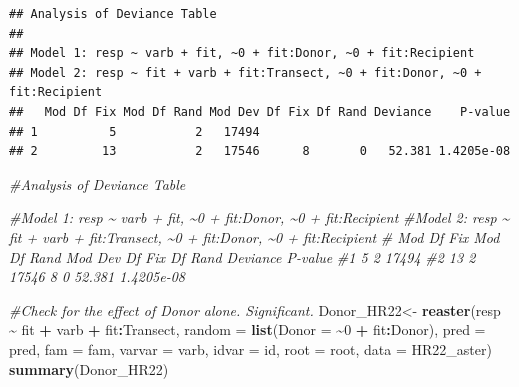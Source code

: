 \documentclass[
]{article}
\newenvironment{Shaded}{\begin{snugshade}}{\end{snugshade}}
\newcommand{\AttributeTok}[1]{\textcolor[rgb]{0.13,0.29,0.53}{#1}}
\newcommand{\CommentTok}[1]{\textcolor[rgb]{0.56,0.35,0.01}{\textit{#1}}}
\newcommand{\DecValTok}[1]{\textcolor[rgb]{0.00,0.00,0.81}{#1}}
\newcommand{\FunctionTok}[1]{\textcolor[rgb]{0.13,0.29,0.53}{\textbf{#1}}}
\newcommand{\NormalTok}[1]{#1}
\newcommand{\OtherTok}[1]{\textcolor[rgb]{0.56,0.35,0.01}{#1}}
\newcommand{\SpecialCharTok}[1]{\textcolor[rgb]{0.81,0.36,0.00}{\textbf{#1}}}
\begin{document}
\begin{verbatim}
## Analysis of Deviance Table
## 
## Model 1: resp ~ varb + fit, ~0 + fit:Donor, ~0 + fit:Recipient
## Model 2: resp ~ fit + varb + fit:Transect, ~0 + fit:Donor, ~0 + fit:Recipient
##   Mod Df Fix Mod Df Rand Mod Dev Df Fix Df Rand Deviance    P-value
## 1          5           2   17494                                   
## 2         13           2   17546      8       0   52.381 1.4205e-08
\end{verbatim}

\begin{Shaded}
\begin{Highlighting}[]
\CommentTok{\#Analysis of Deviance Table}

\CommentTok{\#Model 1: resp \textasciitilde{} varb + fit, \textasciitilde{}0 + fit:Donor, \textasciitilde{}0 + fit:Recipient}
\CommentTok{\#Model 2: resp \textasciitilde{} fit + varb + fit:Transect, \textasciitilde{}0 + fit:Donor, \textasciitilde{}0 + fit:Recipient}
\CommentTok{\#  Mod Df Fix Mod Df Rand Mod Dev Df Fix Df Rand Deviance    P{-}value}
\CommentTok{\#1          5           2   17494                                   }
\CommentTok{\#2         13           2   17546      8       0   52.381 1.4205e{-}08}

\CommentTok{\#Check for the effect of Donor alone. Significant. }
\NormalTok{Donor\_HR22}\OtherTok{\textless{}{-}} \FunctionTok{reaster}\NormalTok{(resp }\SpecialCharTok{\textasciitilde{}}\NormalTok{ fit }\SpecialCharTok{+}\NormalTok{ varb }\SpecialCharTok{+}\NormalTok{ fit}\SpecialCharTok{:}\NormalTok{Transect, }\AttributeTok{random =} \FunctionTok{list}\NormalTok{(}\AttributeTok{Donor =} \SpecialCharTok{\textasciitilde{}}\DecValTok{0} \SpecialCharTok{+} 
\NormalTok{    fit}\SpecialCharTok{:}\NormalTok{Donor), }\AttributeTok{pred =}\NormalTok{ pred, }\AttributeTok{fam =}\NormalTok{ fam, }\AttributeTok{varvar =}\NormalTok{ varb, }
    \AttributeTok{idvar =}\NormalTok{ id, }\AttributeTok{root =}\NormalTok{ root, }\AttributeTok{data =}\NormalTok{ HR22\_aster)}
\FunctionTok{summary}\NormalTok{(Donor\_HR22)}
\end{Highlighting}
\end{Shaded}
\end{document}
